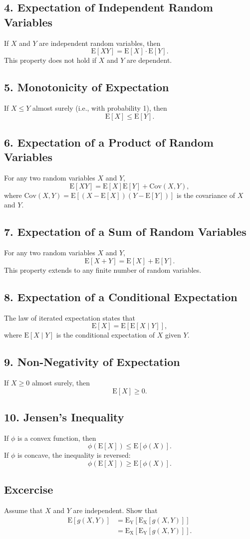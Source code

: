 \documentclass{tufte-handout}
\begin{document}
\subsection*{4. Expectation of Independent Random Variables}
If \( X \) and \( Y \) are independent random variables, then
\[
\mathrm{E}[XY] = \mathrm{E}[X] \cdot \mathrm{E}[Y].
\]
This property does not hold if \( X \) and \( Y \) are dependent.

\subsection*{5. Monotonicity of Expectation}
If \( X \leq Y \) almost surely (i.e., with probability 1), then
\[
\mathrm{E}[X] \leq \mathrm{E}[Y].
\]

\subsection*{6. Expectation of a Product of Random Variables}
For any two random variables \( X \) and \( Y \),
\[
\mathrm{E}[XY] = \mathrm{E}[X]\mathrm{E}[Y] + \text{Cov}(X, Y),
\]
where \( \text{Cov}(X, Y) = \mathrm{E}[(X - \mathrm{E}[X])(Y - \mathrm{E}[Y])] \) is the covariance of \( X \) and \( Y \).

\subsection*{7. Expectation of a Sum of Random Variables}
For any two random variables \( X \) and \( Y \),
\[
\mathrm{E}[X + Y] = \mathrm{E}[X] + \mathrm{E}[Y].
\]
This property extends to any finite number of random variables.

\subsection*{8. Expectation of a Conditional Expectation}
The law of iterated expectation states that
\[
\mathrm{E}[X] = \mathrm{E}[\mathrm{E}[X \mid Y]],
\]
where \( \mathrm{E}[X \mid Y] \) is the conditional expectation of \( X \) given \( Y \).

\subsection*{9. Non-Negativity of Expectation}
If \( X \geq 0 \) almost surely, then
\[
\mathrm{E}[X] \geq 0.
\]

\subsection*{10. Jensen's Inequality}
If \( \phi \) is a convex function, then
\[
\phi(\mathrm{E}[X]) \leq \mathrm{E}[\phi(X)].
\]
If \( \phi \) is concave, the inequality is reversed:
\[
\phi(\mathrm{E}[X]) \geq \mathrm{E}[\phi(X)].
\]




\subsection{Excercise}

Assume that $X$ and $Y$ are independent. Show that
\begin{align*}
\mathrm{E}[g(X,Y)] &= \mathrm{E_Y}[ \mathrm{E_X}[ g(X,Y)]]\\
&=\mathrm{E_X}[ \mathrm{E_Y}[ g(X,Y)]].
\end{align*}
\end{document}
